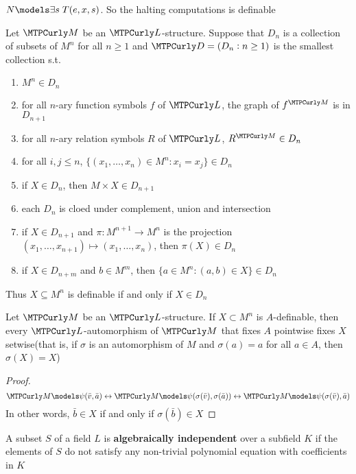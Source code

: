 \documentclass[11pt]{article}
\begin{document}
\(\N\models\exists s\;T(e,x,s)\). So the halting
    computations is definable


\begin{proposition}[]
Let \(\calm\) be an \(\call\)-structure. Suppose that \(D_n\) is a collection of
subsets of \(M^n\) for all \(n\ge 1\) and \(\cald=(D_n:n\ge 1)\) is the smallest
collection s.t. 
\begin{enumerate}
\item \(M^n\in D_n\)
\item for all \(n\)-ary function symbols \(f\) of \(\call\), the graph of \(f^\calm\)
is in \(D_{n+1}\)
\item for all \(n\)-ary relation symbols \(R\) of \(\call\), \(R^\calm\in D_n\)
\item for all \(i,j\le n\), \(\{(x_1,\dots,x_n)\in M^n:x_i=x_j\}\in D_n\)
\item if \(X\in D_n\), then \(M\times X\in D_{n+1}\)
\item each \(D_n\) is cloed under complement, union and intersection
\item if \(X\in D_{n+1}\) and \(\pi:M^{n+1}\to M^n\) is the projection 
\((x_1,\dots,x_{n+1})\mapsto(x_1,\dots,x_n)\), then \(\pi(X)\in D_n\)
\item if \(X\in D_{n+m}\) and \(b\in M^m\), then \(\{a\in M^n:(a,b)\in X\}\in D_n\)
\end{enumerate}


Thus \(X\subseteq M^n\) is definable if and only if \(X\in D_n\)
\end{proposition}

\begin{proposition}[]
Let \(\calm\) be an \(\call\)-structure. If \(X\subset M^n\) is \(A\)-definable,
then every \(\call\)-automorphism of \(\calm\) that fixes \(A\) pointwise fixes
\(X\) setwise(that is, if \(\sigma\) is an automorphism of \(M\) and \(\sigma(a)=a\)
for all \(a\in A\), then \(\sigma(X)=X\))
\end{proposition}

\begin{proof}
\begin{equation*}
\calm\models\psi(\bar{v},\bar{a})\leftrightarrow
\calm\models\psi(\sigma(\bar{v}),\sigma(\bar{a}))\leftrightarrow
\calm\models\psi(\sigma(\bar{v}),\bar{a})
\end{equation*}
In other words, \(\bar{b}\in X\) if and only if \(\sigma(\bar{b})\in X\)
\end{proof}

\begin{definition}[]
A subset \(S\) of a field \(L\) is \textbf{algebraically independent} over a
subfield \(K\) if the elements of 
\(S\) do not satisfy any non-trivial polynomial equation with
coefficients in \(K\) 
\end{definition}
\end{document}
